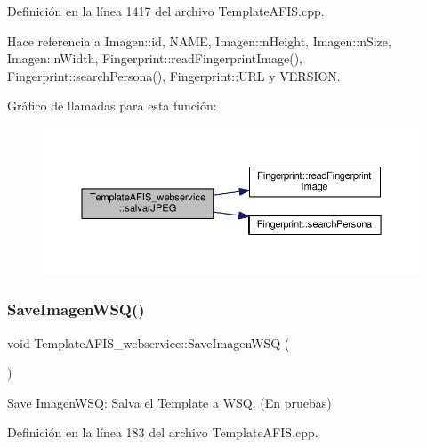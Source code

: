 Definición en la línea 1417 del archivo Template\+A\+F\+I\+S.\+cpp.



Hace referencia a Imagen\+::id, N\+A\+ME, Imagen\+::n\+Height, Imagen\+::n\+Size, Imagen\+::n\+Width, Fingerprint\+::read\+Fingerprint\+Image(), Fingerprint\+::search\+Persona(), Fingerprint\+::\+U\+RL y V\+E\+R\+S\+I\+ON.

Gráfico de llamadas para esta función\+:\nopagebreak
\begin{figure}[H]
\begin{center}
\leavevmode
\includegraphics[width=350pt]{classTemplateAFIS__webservice_a8e3f9279cbfd23a0a89d62c19ddd007c_cgraph}
\end{center}
\end{figure}
\hypertarget{classTemplateAFIS__webservice_ae233b5bd61f6754d877e54788332fe92}{}\label{classTemplateAFIS__webservice_ae233b5bd61f6754d877e54788332fe92} 
\subsubsection{\texorpdfstring{Save\+Imagen\+W\+S\+Q()}{SaveImagenWSQ()}}
{\footnotesize\ttfamily void Template\+A\+F\+I\+S\+\_\+webservice\+::\+Save\+Imagen\+W\+SQ (\begin{DoxyParamCaption}{ }\end{DoxyParamCaption})}



Save Imagen\+W\+SQ\+: Salva el Template a W\+SQ. (En pruebas) 



Definición en la línea 183 del archivo Template\+A\+F\+I\+S.\+cpp.

\hypertarget{classTemplateAFIS__webservice_afc08ffa4abcde0b3c0f1c13d973755e1}{}\label{classTemplateAFIS__webservice_afc08ffa4abcde0b3c0f1c13d973755e1} 
